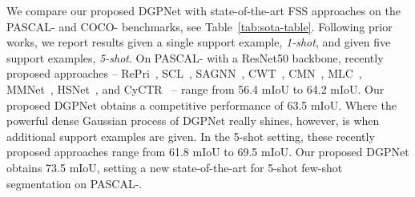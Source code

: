 \begin{table}[t]
    \caption{Performance comparison (mIoU, higher is better), when performing cross-dataset evaluation from COCO- to PASCAL. When using the same ResNet50 backbone, our approach achieves significant improvements for both 1-shot and 5-shot settings, with absolute gains of 5.8 and 11.3 mIoU over RePRI~\cite{boudiaf2021few}.}\centering \vspace{-3mm}
    \label{tab:domaintransfer}
    \vspace{-5mm}
\end{table}

We compare our proposed DGPNet with state-of-the-art FSS approaches on the PASCAL- and COCO- benchmarks, see Table~\ref{tab:sota-table}. Following prior works, we report results given a single support example, \emph{1-shot}, and given five support examples, \emph{5-shot}. On PASCAL- with a ResNet50 backbone, recently proposed approaches -- RePri~\cite{boudiaf2021few}, SCL~\cite{zhang2021self}, SAGNN~\cite{xie2021scale}, CWT~\cite{lu2021simpler}, CMN~\cite{xie2021few}, MLC~\cite{yang2021mining}, MMNet~\cite{wu2021learning}, HSNet~\cite{min2021hypercorrelation}, and CyCTR~\cite{zhang2021few} -- range from 56.4 mIoU to 64.2 mIoU. Our proposed DGPNet obtains a competitive performance of 63.5 mIoU. Where the powerful dense Gaussian process of DGPNet really shines, however, is when additional support examples are given. In the 5-shot setting, these recently proposed approaches range from 61.8 mIoU to 69.5 mIoU. Our proposed DGPNet obtains 73.5 mIoU, setting a new state-of-the-art for 5-shot few-shot segmentation on PASCAL-.

